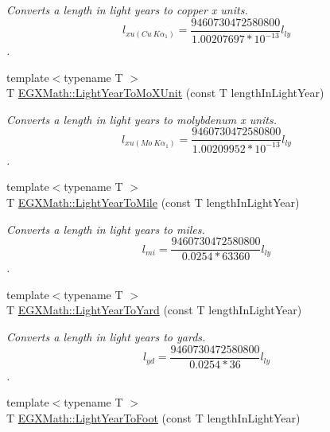 \begin{DoxyCompactItemize}
\begin{DoxyCompactList}\small\item\em Converts a length in light years to copper x units. \[ l_{xu(Cu\ K\alpha_1)}= \frac{9460730472580800}{1.00207697*10^{-13}} l_{ly}\]. \end{DoxyCompactList}\item 
{\footnotesize template$<$typename T $>$ }\\T \mbox{\hyperlink{group___e_g_x_math-_conversions-_length_conversions-_astronomical-_light_year-_non-_s_i_gac275191181b93d118ec2b21cf09ff356}{E\+G\+X\+Math\+::\+Light\+Year\+To\+Mo\+X\+Unit}} (const T length\+In\+Light\+Year)
\begin{DoxyCompactList}\small\item\em Converts a length in light years to molybdenum x units. \[ l_{xu(Mo\ K\alpha_1)}=\frac{9460730472580800}{1.00209952*10^{-13}} l_{ly}\]. \end{DoxyCompactList}\item 
{\footnotesize template$<$typename T $>$ }\\T \mbox{\hyperlink{group___e_g_x_math-_conversions-_length_conversions-_astronomical-_light_year-_imperial_ga3f6a914c8896334f1be6425107a34827}{E\+G\+X\+Math\+::\+Light\+Year\+To\+Mile}} (const T length\+In\+Light\+Year)
\begin{DoxyCompactList}\small\item\em Converts a length in light years to miles. \[ l_{mi}=\frac{9460730472580800}{0.0254 * 63360} l_{ly} \]. \end{DoxyCompactList}\item 
{\footnotesize template$<$typename T $>$ }\\T \mbox{\hyperlink{group___e_g_x_math-_conversions-_length_conversions-_astronomical-_light_year-_imperial_ga78ce9f584c98c3ad8c4daaebb76030d3}{E\+G\+X\+Math\+::\+Light\+Year\+To\+Yard}} (const T length\+In\+Light\+Year)
\begin{DoxyCompactList}\small\item\em Converts a length in light years to yards. \[ l_{yd}= \frac{9460730472580800}{0.0254 * 36} l_{ly} \]. \end{DoxyCompactList}\item 
{\footnotesize template$<$typename T $>$ }\\T \mbox{\hyperlink{group___e_g_x_math-_conversions-_length_conversions-_astronomical-_light_year-_imperial_gac1d171820f3a01eac5bcb514932a3a17}{E\+G\+X\+Math\+::\+Light\+Year\+To\+Foot}} (const T length\+In\+Light\+Year)

\end{DoxyCompactItemize}
